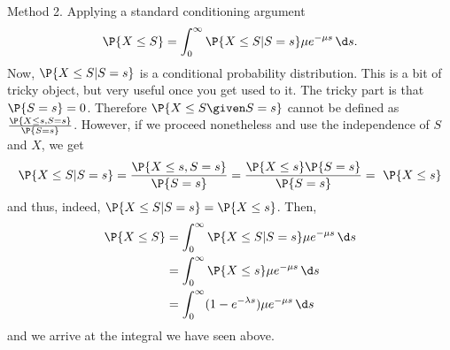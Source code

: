 \begin{question}
\begin{solution}
Method 2. Applying a standard conditioning argument
\begin{equation*}
\P{X\leq S} = \int_0^\infty \P{X\leq S| S=s} \mu e^{-\mu s} \,  \d s.
\end{equation*}
Now, $\P{X\leq S| S=s}$ is a conditional probability
distribution. This is a bit of tricky object, but very useful once you
get used to it. The tricky part is that $\P{S=s} = 0$. Therefore
$\P{X\leq S\given S=s}$ cannot be defined as $\frac{\P{X\leq s,
  S=s}}{\P{S=s}}$. However, if we proceed nonetheless and use the
independence of $S$ and $X$, we get
\begin{equation*}
   \P{X\leq S| S=s} = \frac{\P{X\leq s, S=s}}{\P{S=s}} = \frac{\P{X\leq s} \P{S=s}}{\P{S=s}} = \
\P{X\leq s}
 \end{equation*}
 and thus, indeed, $\P{X\leq S| S=s} = \P{X\leq s}$. Then,
\begin{equation*}
  \begin{split}
\P{X\leq S} 
&= \int_0^\infty \P{X\leq S| S=s} \mu e^{-\mu s} \,  \d s \\
&= \int_0^\infty \P{X\leq s} \mu e^{-\mu s} \,  \d s \\
&= \int_0^\infty (1-e^{-\lambda s})\mu e^{-\mu s} \,  \d s \\
  \end{split}
\end{equation*}
and we arrive at the integral we have seen above. 


\end{solution}
\end{question}
